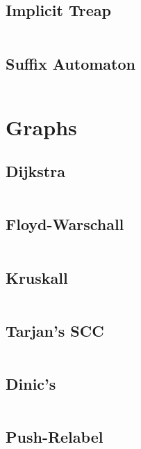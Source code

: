\documentclass[11pt, a4paper]{amsart}
\begin{document}
	\newpage
	\begin{multicols*}{2}
		\subsection{Implicit Treap}
		\inputminted[firstline=16,lastline=57]{c++}{.code/datastructures/implicit_treap.cpp}
		\vfill\null
		\columnbreak
		\subsection{Suffix Automaton}
		\inputminted[firstline=16,lastline=43]{c++}{.code/strings/suffixAutomaton.cpp}
		\vfill\null
	\end{multicols*}
	\section{Graphs}
	\begin{multicols*}{2}
		\subsection{Dijkstra}
		\inputminted[firstline=21,lastline=28]{c++}{.code/graphs/dijkstra.cpp}
		\subsection{Floyd-Warschall}
		\inputminted[firstline=17,lastline=21]{c++}{.code/graphs/floyd_warschall.cpp}
		\subsection{Kruskall}
		\inputminted[firstline=27,lastline=36]{c++}{.code/graphs/kruskall.cpp}
		\subsection{Tarjan's SCC}
		\inputminted[firstline=27,lastline=39]{c++}{.code/graphs/scc.cpp}
		\vfill\null
		\columnbreak
		\subsection{Dinic's}
		\inputminted[firstline=12,lastline=27]{c++}{.code/graphs/dinic.cpp}
		\subsection{Push-Relabel}
		\inputminted[firstline=12,lastline=26]{c++}{.code/graphs/pushrelabel.cpp}
		\vfill\null
	\end{multicols*}
	\newpage
\end{document}
